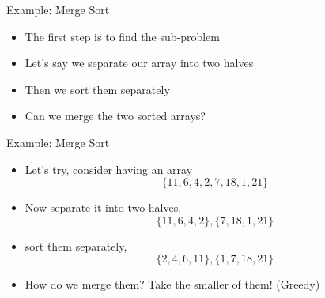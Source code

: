\documentclass[10pt,xcolor={table,dvipsnames},t]{beamer}
\begin{document}
\begin{frame}{Example: Merge Sort}
  \begin{itemize}
    \item The first step is to find the sub-problem
    \item Let's say we separate our array into two halves
    \item Then we sort them separately
    \item Can we merge the two sorted arrays?
  \end{itemize}
\end{frame}

\begin{frame}{Example: Merge Sort}
  \begin{itemize}
    \item Let's try, consider having an array $$\{11,6,4,2,7,18,1,21\}$$
    \item Now separate it into two halves, $$\{11,6,4,2\},\{7,18,1,21\}$$
    \item sort them separately, $$\{2,4,6,11\},\{1,7,18,21\}$$
    \item How do we merge them? Take the smaller of them! (Greedy)
  \end{itemize}
\end{frame}
\end{document}
